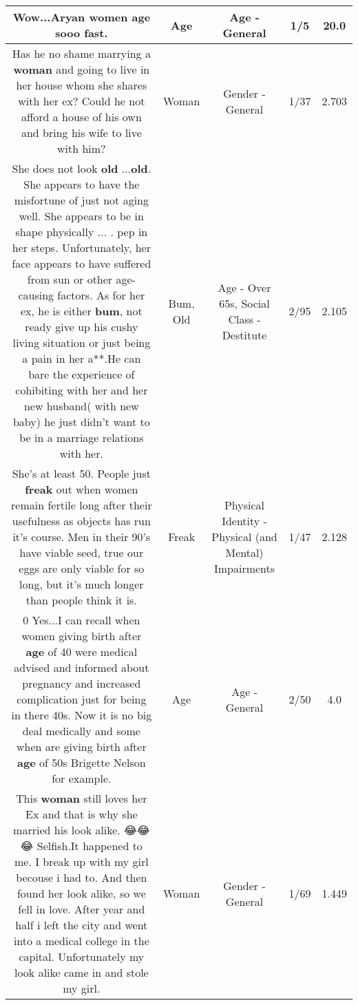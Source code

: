 \documentclass[11pt]{article}
\newlength\mylength
\begin{document}
\begin{center}
\begin{longtable}{|C{.65\mylength}|C{.30\mylength}|C{.12\mylength}|C{.12\mylength}|C{.12\mylength}|}
  \small Wow...Aryan women \textbf{age} sooo fast.\normalsize   & Age & Age - General & 1/5 & 20.0 \\  \hline
  \small Has he no shame marrying a \textbf{woman} and going to live in her house whom she shares with her ex? Could he not afford a house of his own and bring his wife to live with him?\normalsize   & Woman & Gender - General & 1/37 & 2.703 \\  \hline
  \small She does not look \textbf{old} ...\textbf{old}. She appears to have the misfortune of just not aging well. She appears to be in shape physically ... . pep in her steps. Unfortunately, her face appears to have suffered from sun or other age-causing factors. As for her ex, he is either \textbf{bum}, not ready give up his cushy living situation or just being a pain in her a**.He can bare the experience of cohibiting with her and her new husband( with new baby) he just didn't want to be in a marriage relations with her.\normalsize   & Bum, Old & Age - Over 65s, Social Class - Destitute & 2/95 & 2.105 \\  \hline
  \small She's at least 50. People just \textbf{freak} out when women remain fertile long after their usefulness as objects has run it's course. Men in their 90's have viable seed, true our eggs are only viable for so long, but it's much longer than people think it is.\normalsize   & Freak & Physical Identity - Physical (and Mental) Impairments & 1/47 & 2.128 \\  \hline
  \small {} 0 Yes...I can recall when women giving birth after \textbf{age} of 40 were medical advised and informed about pregnancy and increased complication just for being in there 40s. Now it is no big deal medically and some when are giving birth after \textbf{age} of 50s Brigette Nelson for example.\normalsize   & Age & Age - General & 2/50 & 4.0 \\  \hline
  \small This \textbf{woman} still loves her Ex and that is why she married his look alike. 😂😂😂 Selfish.It happened to me. I break up with my girl becouse i had to. And then found her look alike, so we fell  in love. After year and half i left the city and went into a medical college in the capital. Unfortunately my look alike came in and stole my girl.\normalsize   & Woman & Gender - General & 1/69 & 1.449 \\  \hline

\end{longtable}
\end{center}
\end{document}
